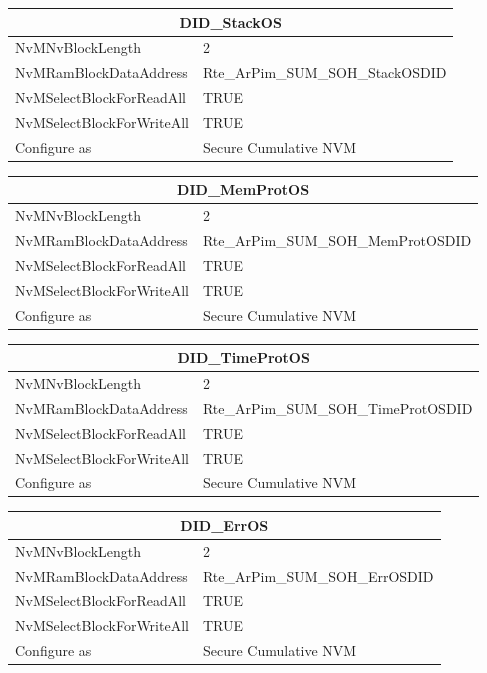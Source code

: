 \begin{tabular}{|l|p{8cm}|}\hline
	\multicolumn{2}{|c|}{\textbf{DID\_StackOS}}\\\hline
	NvMNvBlockLength&2\\\hline
	NvMRamBlockDataAddress&Rte\_ArPim\_SUM\_SOH\_StackOSDID\\\hline
	NvMSelectBlockForReadAll&TRUE\\\hline
	NvMSelectBlockForWriteAll&TRUE\\\hline
	Configure as&Secure Cumulative NVM\\\hline
	\end{tabular}

\begin{tabular}{|l|p{8cm}|}\hline
\multicolumn{2}{|c|}{\textbf{DID\_MemProtOS}}\\\hline
NvMNvBlockLength&2\\\hline
NvMRamBlockDataAddress&Rte\_ArPim\_SUM\_SOH\_MemProtOSDID\\\hline
NvMSelectBlockForReadAll&TRUE\\\hline
NvMSelectBlockForWriteAll&TRUE\\\hline
Configure as&Secure Cumulative NVM\\\hline
\end{tabular}

\begin{tabular}{|l|p{8cm}|}\hline
\multicolumn{2}{|c|}{\textbf{DID\_TimeProtOS}}\\\hline
NvMNvBlockLength&2\\\hline
NvMRamBlockDataAddress&Rte\_ArPim\_SUM\_SOH\_TimeProtOSDID\\\hline
NvMSelectBlockForReadAll&TRUE\\\hline
NvMSelectBlockForWriteAll&TRUE\\\hline
Configure as&Secure Cumulative NVM\\\hline
\end{tabular}

\begin{tabular}{|l|p{8cm}|}\hline
\multicolumn{2}{|c|}{\textbf{DID\_ErrOS}}\\\hline
NvMNvBlockLength&2\\\hline
NvMRamBlockDataAddress&Rte\_ArPim\_SUM\_SOH\_ErrOSDID\\\hline
NvMSelectBlockForReadAll&TRUE\\\hline
NvMSelectBlockForWriteAll&TRUE\\\hline
Configure as&Secure Cumulative NVM\\\hline
\end{tabular}


